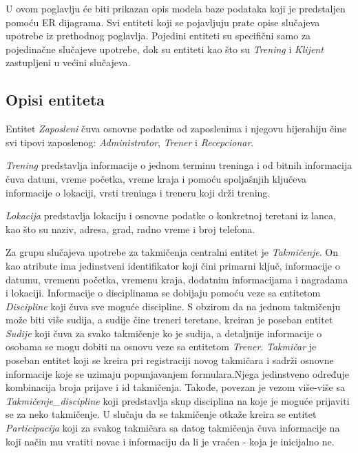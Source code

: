 \documentclass[../main.tex]{subfiles}
\begin{document}
U ovom poglavlju će biti prikazan opis modela baze podataka koji je predstaljen pomoću ER dijagrama. Svi entiteti koji se pojavljuju prate opise slučajeva upotrebe iz prethodnog poglavlja. Pojedini entiteti su specifični samo za pojedinačne slučajeve upotrebe, dok su entiteti kao što su \textit{Trening} i \textit{Klijent} zastupljeni u većini slučajeva. 

\subsection{Opisi entiteta}

Entitet \textit{Zaposleni} čuva osnovne podatke od zaposlenima i njegovu hijerahiju čine svi tipovi zaposlenog: \textit{Administrator}, \textit{Trener} i \textit{Recepcionar}. 

\textit{Trening} predstavlja informacije o jednom terminu treninga i od bitnih informacija čuva datum, vreme početka, vreme kraja i pomoću spoljašnjih ključeva informacije o lokaciji, vrsti treninga i treneru koji drži trening. 

\textit{Lokacija} predstavlja lokaciju i osnovne podatke o konkretnoj teretani iz lanca, kao što su naziv, adresa, grad, radno vreme i broj telefona. 



Za grupu slučajeva upotrebe za takmičenja centralni entitet je \textit{Takmičenje}. On kao atribute ima jedinstveni identifikator koji čini primarni ključ, informacije o datumu, vremenu početka, vremenu kraja, dodatnim informacijama i nagradama i lokaciji. Informacije o disciplinama se dobijaju pomoću veze sa entitetom \textit{Discipline} koji čuva sve moguće discipline. S obzirom da na jednom takmičenju može biti više sudija, a sudije čine treneri teretane, kreiran je poseban entitet \textit{Sudije} koji čuva za svako takmičenje ko je sudija, a detaljnije informacije o osobama se mogu dobiti na osnovu veze sa entitetom \textit{Trener}. \textit{Takmičar} je poseban entitet koji se kreira pri registraciji novog takmičara i sadrži osnovne informacije koje se uzimaju popunjavanjem formulara.Njega jedinstveno određuje kombinacija broja prijave i id takmičenja. Takođe, povezan je vezom više-više sa \textit{Takmičenje\_discipline} koji predstavlja skup disciplina na koje je moguće prijaviti se za neko takmičenje. U slučaju da se takmičenje otkaže kreira se entitet \textit{Participacija} koji za svakog takmičara sa datog takmičenja čuva informacije na koji način mu vratiti novac i informaciju da li je vraćen - koja je inicijalno ne. 
\end{document}
